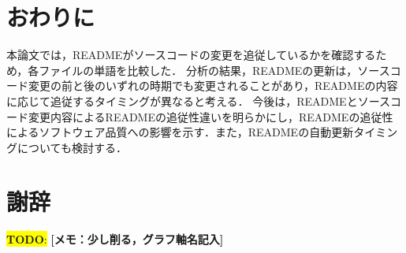 \documentclass[uplatex,dvipdfmx,a4paper,twocolumn,base=11pt,jbase=11pt,ja=standard]{bxjsarticle}  %
\newcommand{\todo}[1]{\colorbox{yellow}{{\bf TODO}:}{\color{red} {\textbf{[#1]}}}}
\begin{document}


\section{おわりに}




本論文では，READMEがソースコードの変更を追従しているかを確認するため，各ファイルの単語を比較した．
分析の結果，READMEの更新は，ソースコード変更の前と後のいずれの時期でも変更されることがあり，READMEの内容に応じて追従するタイミングが異なると考える．
今後は，READMEとソースコード変更内容によるREADMEの追従性違いを明らかにし，READMEの追従性によるソフトウェア品質への影響を示す．また，READMEの自動更新タイミングについても検討する．



\section*{謝辞}




\todo{メモ：少し削る，グラフ軸名記入}




\end{document}
